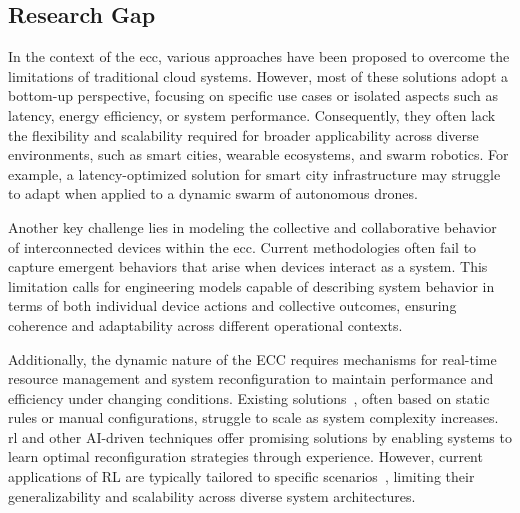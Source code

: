 \documentclass[runningheads]{llncs}
\begin{document}


\subsection{Research Gap}
\label{sec:research-gap}

In the context of the \ac{ecc},
various approaches have been proposed to overcome the limitations of traditional cloud systems.
%
However,
most of these solutions adopt a bottom-up perspective,
focusing on specific use cases or isolated aspects such as latency,
energy efficiency,
or system performance.
%
Consequently,
they often lack the flexibility and scalability required for broader applicability across diverse environments,
such as smart cities,
wearable ecosystems,
and swarm robotics.
%
For example,
a latency-optimized solution for smart city infrastructure may struggle to adapt when applied to a dynamic swarm of autonomous drones.

Another key challenge lies in modeling the collective and collaborative behavior of interconnected devices within the \ac{ecc}.
%
Current methodologies often fail to capture emergent behaviors that arise when devices interact as a system.
%
This limitation calls for engineering models capable of describing system behavior in terms of both individual device actions and collective outcomes,
ensuring coherence and adaptability across different operational contexts.

Additionally,
the dynamic nature of the ECC requires mechanisms for real-time resource management and system reconfiguration to maintain performance and efficiency under changing conditions.
%
Existing solutions~\cite{DBLP:conf/isola/CabriCCNPTZ14},
often based on static rules or manual configurations, struggle to scale as system complexity increases.
%
\ac{rl} and other AI-driven techniques offer promising solutions by enabling systems to learn optimal reconfiguration strategies through experience.
%
However,
current applications of RL are typically tailored to specific scenarios~\cite{DBLP:journals/tpds/JayanettiHB24},
limiting their generalizability and scalability across diverse system architectures.
\end{document}
